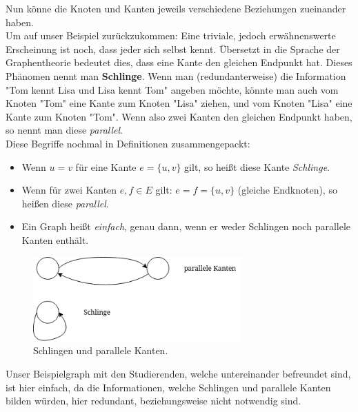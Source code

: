 \documentclass{article}
\theoremstyle{plain}
\begin{document}
\newpage
Nun könne die Knoten und Kanten jeweils verschiedene Beziehungen zueinander haben.\\
Um auf unser Beispiel zurückzukommen: Eine triviale, jedoch erwähnenswerte Erscheinung ist noch, dass jeder sich selbst kennt. Übersetzt in die Sprache der Graphentheorie bedeutet dies, dass eine Kante den gleichen Endpunkt hat. Dieses Phänomen nennt man \textbf{Schlinge}.
\bigskip
Wenn man (redundanterweise) die Information "Tom kennt Lisa und Lisa kennt Tom" angeben möchte, könnte man auch vom Knoten "Tom" eine Kante zum Knoten "Lisa" ziehen, und vom Knoten "Lisa" eine Kante zum Knoten "Tom". Wenn also zwei Kanten den gleichen Endpunkt haben, so nennt man diese \textit{parallel}.\\
\bigskip
Diese Begriffe nochmal in Definitionen zusammengepackt:\\
\begin{itemize}
	\item Wenn \(u = v\) für eine Kante \(e = \{u, v\}\) gilt, so heißt diese Kante \textit{Schlinge}.
	\item Wenn für zwei Kanten \(e, f \in E\) gilt: \(e = f = \{u, v\}\) (gleiche Endknoten), so heißen diese \textit{parallel}. 
	\item Ein Graph heißt \textit{einfach}, genau dann, wenn er weder Schlingen noch parallele Kanten enthält.
\end{itemize}
\begin{figure}[!htp]
    \centering
    \includegraphics[width=8cm]{vortrag_schriftlich/images/graph_two.drawio.png}
    \caption{Schlingen und parallele Kanten.}
    \label{fig:fig2}
\end{figure}
Unser Beispielgraph mit den Studierenden, welche untereinander befreundet sind, ist hier einfach, da die Informationen, welche Schlingen und parallele Kanten bilden würden, hier redundant, beziehungsweise nicht notwendig sind.\\
\end{document}
